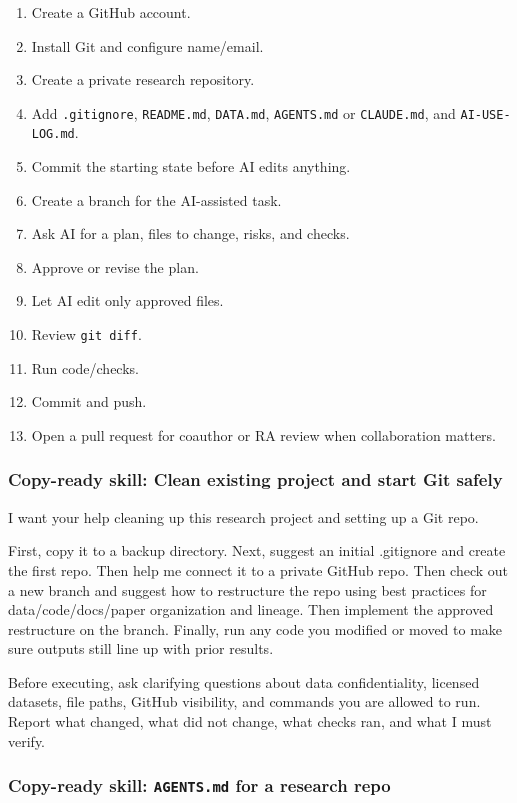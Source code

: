 \documentclass[11pt]{article}
\newcommand{\skill}[1]{\subsubsection*{Copy-ready skill: #1}}
\begin{document}
\begin{enumerate}[leftmargin=2em]
  \item Create a GitHub account.
  \item Install Git and configure name/email.
  \item Create a private research repository.
  \item Add \texttt{.gitignore}, \texttt{README.md}, \texttt{DATA.md}, \texttt{AGENTS.md} or \texttt{CLAUDE.md}, and \texttt{AI-USE-LOG.md}.
  \item Commit the starting state before AI edits anything.
  \item Create a branch for the AI-assisted task.
  \item Ask AI for a plan, files to change, risks, and checks.
  \item Approve or revise the plan.
  \item Let AI edit only approved files.
  \item Review \texttt{git diff}.
  \item Run code/checks.
  \item Commit and push.
  \item Open a pull request for coauthor or RA review when collaboration matters.
\end{enumerate}

\skill{Clean existing project and start Git safely}

\begin{promptblock}
I want your help cleaning up this research project and setting up a Git repo.

First, copy it to a backup directory. Next, suggest an initial .gitignore and
create the first repo. Then help me connect it to a private GitHub repo. Then
check out a new branch and suggest how to restructure the repo using best
practices for data/code/docs/paper organization and lineage. Then implement the
approved restructure on the branch. Finally, run any code you modified or moved
to make sure outputs still line up with prior results.

Before executing, ask clarifying questions about data confidentiality, licensed
datasets, file paths, GitHub visibility, and commands you are allowed to run.
Report what changed, what did not change, what checks ran, and what I must verify.
\end{promptblock}

\skill{\texttt{AGENTS.md} for a research repo}
\end{document}

